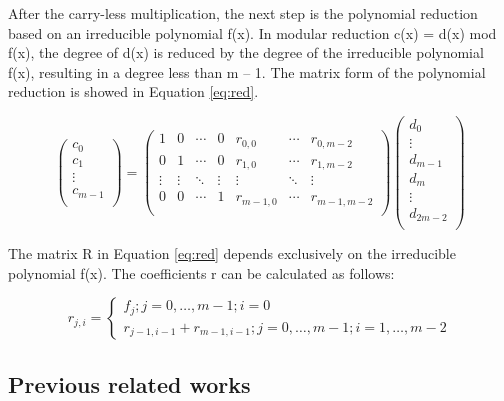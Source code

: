 After the carry-less multiplication, the next step is the polynomial reduction based on an 
irreducible polynomial f(x). In modular reduction c(x) = d(x) mod f(x), the degree of d(x) is 
reduced by the degree of the irreducible polynomial f(x), resulting in a degree less than m – 1.
The matrix form of the polynomial reduction is showed in Equation \ref{eq:red}.


\begin{equation}\label{eq:red}
    \begin{pmatrix}
        c_{0} \\
        c_{1} \\
        \vdots \\
        c_{m-1} \\
    \end{pmatrix}
    =
    \begin{pmatrix}
        1 & 0 & \cdots & 0 & r_{0,0} & \cdots & r_{0,m-2} \\
        0 & 1 & \cdots & 0 & r_{1,0} & \cdots & r_{1,m-2} \\
        \vdots & \vdots & \ddots & \vdots & \vdots & \ddots & \vdots \\
        0 & 0 & \cdots & 1 & r_{m-1,0} & \cdots & r_{m-1,m-2} \\
    \end{pmatrix}
    \begin{pmatrix}
        d_{0} \\
        \vdots \\
        d_{m-1} \\
        d_{m} \\
        \vdots \\
        d_{2m-2} \\
    \end{pmatrix}
\end{equation}

The matrix R in Equation \ref{eq:red} depends exclusively on the irreducible polynomial f(x). 
The coefficients r can be calculated as follows:

\begin{equation}
    r_{j,i}
    =
    \left\{\begin{matrix}
    f_{j};j=0,\hdots,m-1; i=0 \\ 
    r_{j-1,i-1}+r_{m-1,i-1}; j=0,\hdots,m-1;i=1,\hdots,m-2
\end{matrix}\right.
    \label{eq:red2}
\end{equation}


\subsection{Previous related works}

